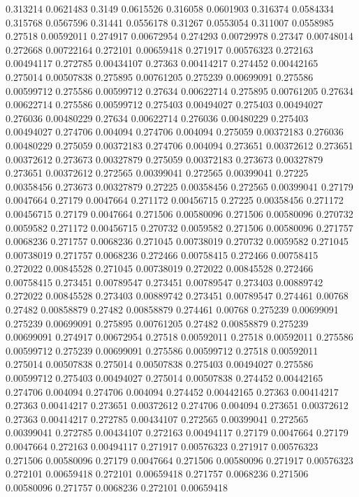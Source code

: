 0.313214 0.0621483
0.3149 0.0615526
0.316058 0.0601903
0.316374 0.0584334
0.315768 0.0567596
0.31441 0.0556178
0.31267 0.0553054
0.311007 0.0558985
0.27518 0.00592011
0.274917 0.00672954
0.274293 0.00729978
0.27347 0.00748014
0.272668 0.00722164
0.272101 0.00659418
0.271917 0.00576323
0.272163 0.00494117
0.272785 0.00434107
0.27363 0.00414217
0.274452 0.00442165
0.275014 0.00507838
0.275895 0.00761205
0.275239 0.00699091
0.275586 0.00599712
0.275586 0.00599712
0.27634 0.00622714
0.275895 0.00761205
0.27634 0.00622714
0.275586 0.00599712
0.275403 0.00494027
0.275403 0.00494027
0.276036 0.00480229
0.27634 0.00622714
0.276036 0.00480229
0.275403 0.00494027
0.274706 0.004094
0.274706 0.004094
0.275059 0.00372183
0.276036 0.00480229
0.275059 0.00372183
0.274706 0.004094
0.273651 0.00372612
0.273651 0.00372612
0.273673 0.00327879
0.275059 0.00372183
0.273673 0.00327879
0.273651 0.00372612
0.272565 0.00399041
0.272565 0.00399041
0.27225 0.00358456
0.273673 0.00327879
0.27225 0.00358456
0.272565 0.00399041
0.27179 0.0047664
0.27179 0.0047664
0.271172 0.00456715
0.27225 0.00358456
0.271172 0.00456715
0.27179 0.0047664
0.271506 0.00580096
0.271506 0.00580096
0.270732 0.0059582
0.271172 0.00456715
0.270732 0.0059582
0.271506 0.00580096
0.271757 0.0068236
0.271757 0.0068236
0.271045 0.00738019
0.270732 0.0059582
0.271045 0.00738019
0.271757 0.0068236
0.272466 0.00758415
0.272466 0.00758415
0.272022 0.00845528
0.271045 0.00738019
0.272022 0.00845528
0.272466 0.00758415
0.273451 0.00789547
0.273451 0.00789547
0.273403 0.00889742
0.272022 0.00845528
0.273403 0.00889742
0.273451 0.00789547
0.274461 0.00768
0.27482 0.00858879
0.27482 0.00858879
0.274461 0.00768
0.275239 0.00699091
0.275239 0.00699091
0.275895 0.00761205
0.27482 0.00858879
0.275239 0.00699091
0.274917 0.00672954
0.27518 0.00592011
0.27518 0.00592011
0.275586 0.00599712
0.275239 0.00699091
0.275586 0.00599712
0.27518 0.00592011
0.275014 0.00507838
0.275014 0.00507838
0.275403 0.00494027
0.275586 0.00599712
0.275403 0.00494027
0.275014 0.00507838
0.274452 0.00442165
0.274706 0.004094
0.274706 0.004094
0.274452 0.00442165
0.27363 0.00414217
0.27363 0.00414217
0.273651 0.00372612
0.274706 0.004094
0.273651 0.00372612
0.27363 0.00414217
0.272785 0.00434107
0.272565 0.00399041
0.272565 0.00399041
0.272785 0.00434107
0.272163 0.00494117
0.27179 0.0047664
0.27179 0.0047664
0.272163 0.00494117
0.271917 0.00576323
0.271917 0.00576323
0.271506 0.00580096
0.27179 0.0047664
0.271506 0.00580096
0.271917 0.00576323
0.272101 0.00659418
0.272101 0.00659418
0.271757 0.0068236
0.271506 0.00580096
0.271757 0.0068236
0.272101 0.00659418

